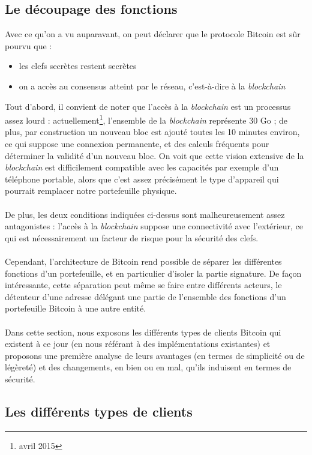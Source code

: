 \documentclass[11pt,a4paper]{article}
\begin{document}
\subsection{Le découpage des fonctions}
Avec ce qu'on a vu auparavant, on peut déclarer que le protocole Bitcoin est sûr pourvu que :\begin{itemize}
	\item les clefs secrètes restent secrètes
	\item on a accès au consensus atteint par le réseau, c'est-à-dire à la \textit{blockchain}\\
\end{itemize}
Tout d'abord, il convient de noter que l'accès à la \textit{blockchain} est un processus assez lourd : actuellement\footnote{avril 2015}, l'ensemble de la \textit{blockchain} représente 30 Go ; de plus, par construction un nouveau bloc est ajouté toutes les 10 minutes environ, ce qui suppose une connexion permanente, et des calculs fréquents pour déterminer la validité d'un nouveau bloc. On voit que cette vision extensive de la \textit{blockchain} est difficilement compatible avec les capacités par exemple d'un téléphone portable, alors que c'est assez précisément le type d'appareil qui pourrait remplacer notre portefeuille physique.\\\\ 
De plus, les deux conditions indiquées ci-dessus sont malheureusement assez antagonistes : l'accès à la \textit{blockchain} suppose une connectivité avec l'extérieur, ce qui est nécessairement un facteur de risque pour la sécurité des clefs.\\\\
Cependant, l'architecture de Bitcoin rend possible de séparer les différentes fonctions d'un portefeuille, et en particulier d'isoler la partie signature. De façon intéressante, cette séparation peut même se faire entre différents acteurs, le détenteur d'une adresse délégant une partie de l'ensemble des fonctions d'un portefeuille Bitcoin à une autre entité.\\\\
Dans cette section, nous exposons les différents types de clients Bitcoin qui existent à ce jour (en nous référant à des implémentations existantes) et proposons une première analyse de leurs avantages (en termes de simplicité ou de légèreté) et des changements, en bien ou en mal, qu'ils induisent en termes de sécurité.
\subsection{Les différents types de clients}
\end{document}
